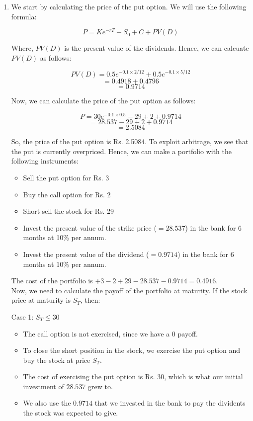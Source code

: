\documentclass[a4paper]{article}
\begin{document}
\begin{enumerate}[label=(\alph*)]
    \item We start by calculating the price of the put option. We will use the following formula:
    
    \[ P = Ke^{-rT} - S_0 + C + PV(D) \]

    Where, $PV(D)$ is the present value of the dividends. Hence, we can calcuate $PV(D)$ as follows:

    \[ PV(D) = 0.5e^{-0.1 \times 2/12} + 0.5e^{-0.1 \times 5/12} \]
    \[ = 0.4918 + 0.4796 \]
    \[ = 0.9714 \]

    Now, we can calculate the price of the put option as follows:

    \[ P = 30e^{-0.1 \times 0.5} - 29 + 2 + 0.9714 \]
    \[ = 28.537 - 29 + 2 + 0.9714 \]
    \[ = 2.5084 \]

    So, the price of the put option is Rs. 2.5084. To exploit arbitrage, we see that the put is currently overpriced. Hence, we can make a portfolio with the following instruments:
    \begin{itemize}
        \item Sell the put option for Rs. 3
        \item Buy the call option for Rs. 2
        \item Short sell the stock for Rs. 29
        \item Invest the present value of the strike price ($= 28.537$) in the bank for 6 months at 10\% per annum.
        \item Invest the present value of the dividend ($= 0.9714$) in the bank for 6 months at 10\% per annum.
    \end{itemize}

    The cost of the portfolio is $+3 - 2 + 29 - 28.537 - 0.9714 = 0.4916$. \\

    Now, we need to calculate the payoff of the portfolio at maturity. If the stock price at maturity is $S_T$, then:

    Case 1: $S_T \leq 30$
    \begin{itemize}
        \item The call option is not exercised, since we have a 0 payoff.
        \item To close the short position in the stock, we exercise the put option and buy the stock at price $S_T$.
        \item The cost of exercising the put option is Rs. $30$, which is what our initial investment of $28.537$ grew to.
        \item We also use the $0.9714$ that we invested in the bank to pay the dividents the stock was expected to give.
    \end{itemize}


\end{enumerate}
\end{document}

